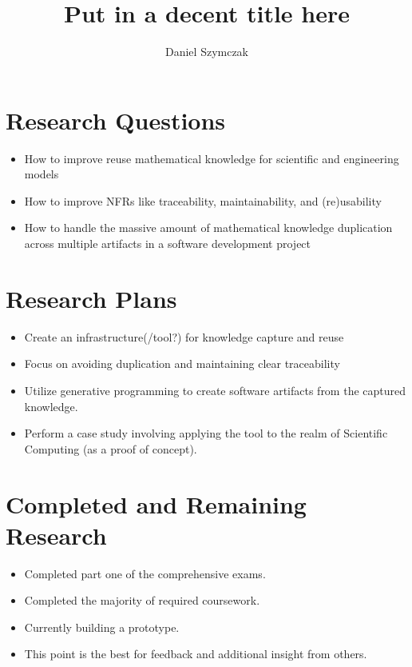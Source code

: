 \documentclass[11pt]{article} %
\title{Put in a decent title here}
\author{Daniel Szymczak}
\begin{document}
\maketitle

\section{Research Questions}

\begin{itemize}
	\item How to improve reuse mathematical knowledge for scientific and engineering models
	\item How to improve NFRs like traceability, maintainability, and (re)usability
	\item How to handle the massive amount of mathematical knowledge duplication
					across multiple artifacts in a software development project
\end{itemize}

\section{Research Plans}

\begin{itemize}
	\item Create an infrastructure(/tool?) for knowledge capture and reuse %
	\item Focus on avoiding duplication and maintaining clear traceability
	\item Utilize generative programming to create software artifacts from the
					captured knowledge.
	\item Perform a case study involving applying the tool to the realm of
					Scientific Computing (as a proof of concept).
\end{itemize}

\section{Completed and Remaining Research}
\begin{itemize}
	\item Completed part one of the comprehensive exams.
	\item Completed the majority of required coursework.
	\item Currently building a prototype.
	\item This point is the best for feedback and additional insight from others.
	
\end{itemize}
\end{document}
